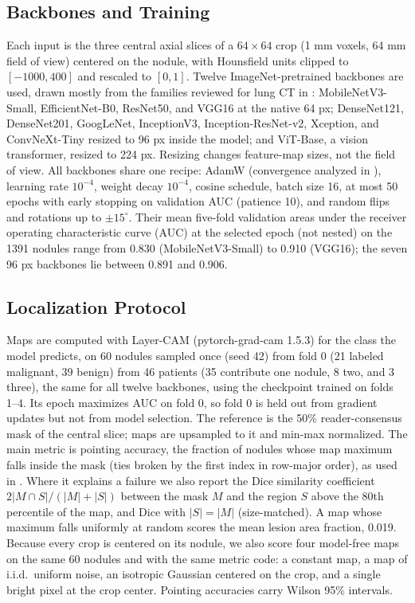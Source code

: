 \documentclass[conference]{IEEEtran}
\begin{document}
\subsection{Backbones and Training}\label{sec:training}
Each input is the three central axial slices of a $64\times64$ crop (1 mm voxels, 64 mm field of view) centered on the nodule, with Hounsfield units clipped to $[-1000,400]$ and rescaled to $[0,1]$. Twelve ImageNet-pretrained backbones are used, drawn mostly from the families reviewed for lung CT in \cite{abdullahi_review_2025}: MobileNetV3-Small, EfficientNet-B0, ResNet50, and VGG16 at the native 64 px; DenseNet121, DenseNet201, GoogLeNet, InceptionV3, Inception-ResNet-v2, Xception, and ConvNeXt-Tiny \cite{liu_convnext_2022} resized to 96 px inside the model; and ViT-Base, a vision transformer, resized to 224 px. Resizing changes feature-map sizes, not the field of view. All backbones share one recipe: AdamW (convergence analyzed in \cite{zhou_adamw_2024}), learning rate $10^{-4}$, weight decay $10^{-4}$, cosine schedule, batch size 16, at most 50 epochs with early stopping on validation AUC (patience 10), and random flips and rotations up to $\pm15^\circ$. Their mean five-fold validation areas under the receiver operating characteristic curve (AUC) at the selected epoch (not nested) on the 1391 nodules range from 0.830 (MobileNetV3-Small) to 0.910 (VGG16); the seven 96 px backbones lie between 0.891 and 0.906.

\subsection{Localization Protocol}\label{sec:loc}
Maps are computed with Layer-CAM (pytorch-grad-cam 1.5.3) for the class the model predicts, on 60 nodules sampled once (seed 42) from fold 0 (21 labeled malignant, 39 benign) from 46 patients (35 contribute one nodule, 8 two, and 3 three), the same for all twelve backbones, using the checkpoint trained on folds 1--4. Its epoch maximizes AUC on fold 0, so fold 0 is held out from gradient updates but not from model selection. The reference is the 50\% reader-consensus mask of the central slice; maps are upsampled to it and min-max normalized. The main metric is pointing accuracy, the fraction of nodules whose map maximum falls inside the mask (ties broken by the first index in row-major order), as used in \cite{katar_transformer_2026}. Where it explains a failure we also report the Dice similarity coefficient $2|M\cap S|/(|M|+|S|)$ between the mask $M$ and the region $S$ above the 80th percentile of the map, and Dice with $|S|=|M|$ (size-matched). A map whose maximum falls uniformly at random scores the mean lesion area fraction, 0.019. Because every crop is centered on its nodule, we also score four model-free maps on the same 60 nodules and with the same metric code: a constant map, a map of i.i.d.\ uniform noise, an isotropic Gaussian centered on the crop, and a single bright pixel at the crop center. Pointing accuracies carry Wilson 95\% intervals.
\end{document}
